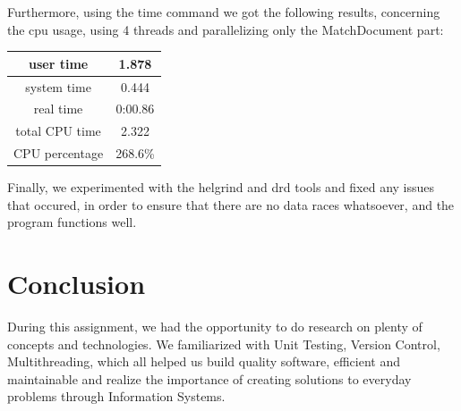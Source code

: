 \documentclass{article}
\begin{document}
Furthermore, using the time command we got the following results, concerning the cpu usage, using 4 threads and parallelizing only the MatchDocument part:
\begin{center}
\begin{tabular}{||c c||} 
 \hline
 user time & 1.878\\ 
 \hline
system time & 0.444\\
 \hline
real time & 0:00.86\\
 \hline
 total CPU time & 2.322\\
 \hline
 CPU percentage &  268.6\%\\
 \hline
\end{tabular}
\end{center}
Finally, we experimented with the helgrind and drd tools and fixed any issues that occured, in order to ensure that there are no data races whatsoever, and the program functions well.
\section{Conclusion}
During this assignment, we had the opportunity to do research on plenty of concepts and technologies. We familiarized with Unit Testing, Version Control, Multithreading, which all helped us build quality software, efficient and maintainable and realize the importance of creating solutions to everyday problems through Information Systems.
\end{document}
